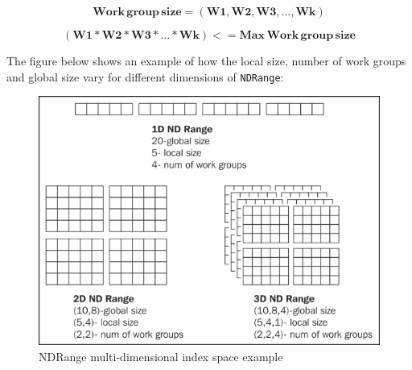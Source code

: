 \begin{equation}
\mathbf{Work\, group\, size = (W1, W2, W3, ..., Wk)} 
\end{equation}

\begin{equation}
\mathbf{(W1 * W2 * W3 * ... * Wk) <= Max\, Work\, group\, size}
\end{equation} \newline

The figure below shows an example of how the local size, number of work groups and global size vary for different dimensions of \verb|NDRange|:
\begin{figure}[h!]
\centering
\includegraphics[width=\linewidth]{figures/NDRange_Kernel_Example.jpg}
\caption{NDRange multi-dimensional index space example}
\label{fig:opencl4}
\end{figure}

